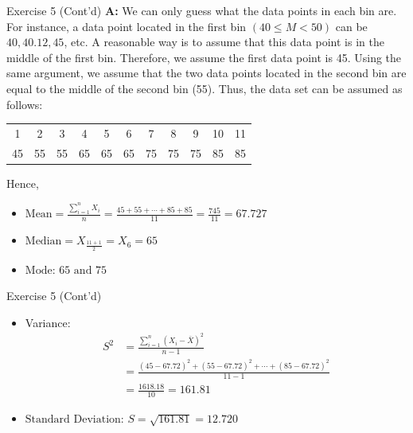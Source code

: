 \documentclass[
  ignorenonframetext,
  aspectratio=43,
]{beamer}
\let\olditem\item
\renewcommand\item{\olditem\justifying}
\begin{document}
\begin{frame}{Exercise 5 (Cont'd)}
\protect\hypertarget{exercise-5-contd}{}
\textbf{A:} We can only guess what the data points in each bin are. For
instance, a data point located in the first bin \((40 \le M < 50)\) can
be \(40, 40.12, 45\), etc. A reasonable way is to assume that this data
point is in the middle of the first bin. Therefore, we assume the first
data point is 45. Using the same argument, we assume that the two data
points located in the second bin are equal to the middle of the second
bin (55). Thus, the data set can be assumed as follows:

\vspace{5pt}

\scriptsize
\begin{table}
\centering
\begin{tabular}{ccccccccccc}
1 & 2 & 3 & 4 & 5 & 6 & 7 & 8 & 9 & 10 & 11 \\[3pt]
45 & 55 & 55 & 65 & 65 & 65 & 75 & 75 & 75 & 85 & 85 \\
\end{tabular}
\end{table}
\normalsize

Hence,

\begin{itemize}
\item
  \(\text{Mean} = \frac{\sum_{i=1}^{n} X_i}{n} = \frac{45 + 55 + \cdots + 85 + 85}{11} = \frac{745}{11} = 67.727\)
\item
  \(\text{Median} = X_{\frac{11+1}{2}} = X_6 = 65\)
\item
  \(\text{Mode: } 65 \text{ and } 75\)
\end{itemize}
\end{frame}

\begin{frame}{Exercise 5 (Cont'd)}
\protect\hypertarget{exercise-5-contd-1}{}
\begin{itemize}
\item
  Variance: \[
    \begin{aligned}
    S^2 & = \frac{\sum_{i=1}^{n}(X_i - \bar{X})^2}{n - 1} \\
                       &= \frac{(45 - 67.72)^2 + (55 - 67.72)^2 + \cdots + (85 - 67.72)^2}{11 - 1}  \\ 
                       &= \frac{1618.18}{10} = 161.81
    \end{aligned}
    \]
\item
  \(\text{Standard Deviation: } S = \sqrt{161.81} = 12.720\)
\end{itemize}
\end{frame}
\end{document}
